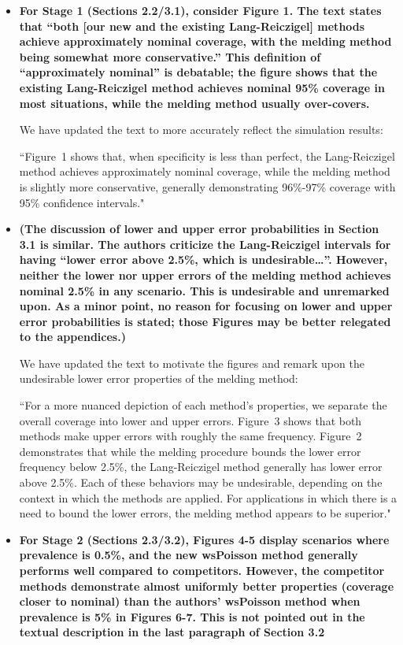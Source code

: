 \documentclass[11pt]{article}
\begin{document}
\begin{itemize}
    \item \textbf{For Stage 1 (Sections 2.2/3.1), consider Figure 1. The text states that “both [our new and the existing Lang-Reiczigel] methods achieve approximately nominal coverage, with the melding method being somewhat more conservative.” This definition of “approximately nominal” is debatable; the figure shows that the existing Lang-Reiczigel method achieves nominal 95\% coverage in most situations, while the melding method usually over-covers.}
    
    We have updated the text to more accurately reflect the simulation results:
    
    ``Figure~1 shows that, when specificity is less than perfect, the Lang-Reiczigel method achieves approximately nominal coverage, while the melding method is slightly more conservative, generally demonstrating 96\%-97\% coverage with 95\% confidence intervals."

    \item \textbf{(The discussion of lower and upper error probabilities in Section 3.1 is similar. The authors criticize the Lang-Reiczigel intervals for having “lower error above 2.5\%, which is undesirable…”. However, neither the lower nor upper errors of the melding method achieves nominal 2.5\% in any scenario. This is undesirable and unremarked upon. As a minor point, no reason for focusing on lower and upper error probabilities is stated; those Figures may be better relegated to the appendices.)}
    
    We have updated the text to motivate the figures and remark upon the undesirable lower error properties of the melding method:
    
    ``For a more nuanced depiction of each method's properties, we separate the overall coverage into lower and upper errors.
    Figure~3 shows that both methods make upper errors with roughly the same frequency.
    Figure~2 demonstrates that while the melding procedure bounds the lower error frequency below 2.5\%, the Lang-Reiczigel method generally has lower error above 2.5\%.
    Each of these behaviors may be undesirable, depending on the context in which the methods are applied.
    For applications in which there is a need to bound the lower errors, the melding method appears to be superior."

    \item \textbf{For Stage 2 (Sections 2.3/3.2), Figures 4-5 display scenarios where prevalence is 0.5\%, and the new wsPoisson method generally performs well compared to competitors. However, the competitor methods demonstrate almost uniformly better properties (coverage closer to nominal) than the authors’ wsPoisson method when prevalence is 5\% in Figures 6-7. This is not pointed out in the textual description in the last paragraph of Section 3.2}


\end{itemize}
\end{document}
